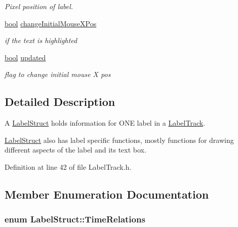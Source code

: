 \begin{DoxyCompactItemize}
\begin{DoxyCompactList}\small\item\em Pixel position of label. \end{DoxyCompactList}\item 
\hyperlink{mac_2config_2i386_2lib-src_2libsoxr_2soxr-config_8h_abb452686968e48b67397da5f97445f5b}{bool} \hyperlink{class_label_struct_a90f50bd9dc6af6bb11ef999c42b1b85d}{change\+Initial\+Mouse\+X\+Pos}
\begin{DoxyCompactList}\small\item\em if the text is highlighted \end{DoxyCompactList}\item 
\hyperlink{mac_2config_2i386_2lib-src_2libsoxr_2soxr-config_8h_abb452686968e48b67397da5f97445f5b}{bool} \hyperlink{class_label_struct_ae3885ef0e16798f57e24f7f996921338}{updated}
\begin{DoxyCompactList}\small\item\em flag to change initial mouse X pos \end{DoxyCompactList}\end{DoxyCompactItemize}


\subsection{Detailed Description}
A \hyperlink{class_label_struct}{Label\+Struct} holds information for O\+NE label in a \hyperlink{class_label_track}{Label\+Track}. 

\hyperlink{class_label_struct}{Label\+Struct} also has label specific functions, mostly functions for drawing different aspects of the label and its text box. 

Definition at line 42 of file Label\+Track.\+h.



\subsection{Member Enumeration Documentation}
\subsubsection[{\texorpdfstring{Time\+Relations}{TimeRelations}}]{\setlength{\rightskip}{0pt plus 5cm}enum {\bf Label\+Struct\+::\+Time\+Relations}}\hypertarget{class_label_struct_a3e70ad31acce8270b0796c9e46bbdfe8}{}\label{class_label_struct_a3e70ad31acce8270b0796c9e46bbdfe8}


